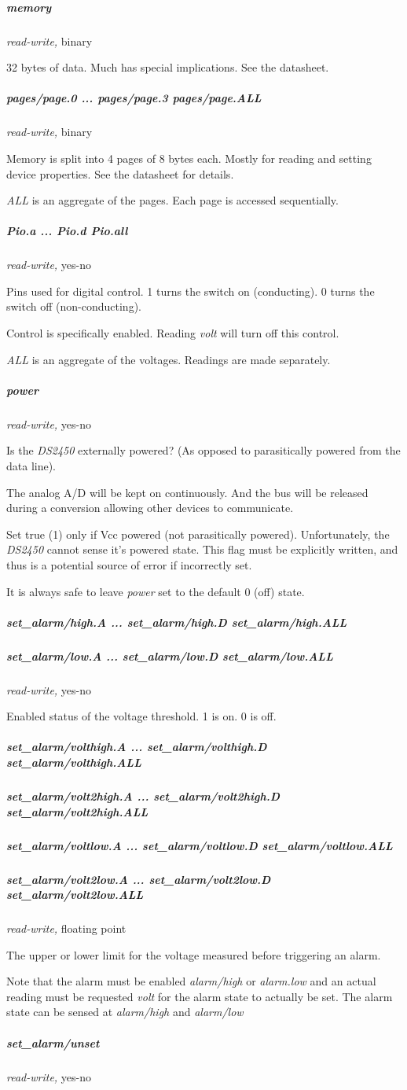\subparagraph*{memory}\textit{read-write,} binary 

32 bytes of data. Much has special implications. See the datasheet. 
\subparagraph*{pages/page.0
... pages/page.3 pages/page.ALL}\textit{read-write,} binary 

Memory is split into 4 pages of 8 bytes each. Mostly for reading and setting
device properties. See the datasheet for details. 

\textit{ALL} is an aggregate of the pages. Each page is accessed sequentially. 
\subparagraph*{Pio.a
... Pio.d Pio.all}\textit{read-write,} yes-no 

Pins used for digital control. 1 turns the switch on (conducting). 0 turns
the switch off (non-conducting). 

Control is specifically enabled. Reading \textit{volt} will turn off this control.


\textit{ALL} is an aggregate of the voltages. Readings are made separately. 
\subparagraph*{power}\textit{read-write,}
yes-no 

Is the \textit{DS2450} externally powered? (As opposed to parasitically powered
from the data line). 

The analog A/D  will be kept on continuously. And the bus will be released
during a conversion allowing other devices to communicate. 

Set \textsf{true (1)} only if Vcc powered (not parasitically powered). Unfortunately,
the \textit{DS2450} cannot sense it's powered state. This flag must be explicitly
written, and thus is a potential source of error if incorrectly set. 

It is always safe to leave \textit{power} set to the default 0 (off) state. 
\subparagraph*{set\_alarm/high.A
... set\_alarm/high.D set\_alarm/high.ALL}
\subparagraph*{set\_alarm/low.A ... set\_alarm/low.D set\_alarm/low.ALL}\textit{read-write,}
yes-no 

Enabled status of the voltage threshold. 1 is on. 0 is off. 
\subparagraph*{set\_alarm/volthigh.A
... set\_alarm/volthigh.D set\_alarm/volthigh.ALL}
\subparagraph*{set\_alarm/volt2high.A ... set\_alarm/volt2high.D
set\_alarm/volt2high.ALL}
\subparagraph*{set\_alarm/voltlow.A ... set\_alarm/voltlow.D set\_alarm/voltlow.ALL}
\subparagraph*{set\_alarm/volt2low.A
... set\_alarm/volt2low.D set\_alarm/volt2low.ALL}\textit{read-write,} floating point 

The upper or lower limit for the voltage measured before triggering an
alarm. 

Note that the alarm must be enabled \textit{alarm/high} or \textit{alarm.low} and an actual
reading must be requested \textit{volt} for the alarm state to actually be set. The
alarm state can be sensed at \textit{alarm/high} and \textit{alarm/low} 
\subparagraph*{set\_alarm/unset}\textit{read-write,}
yes-no 

